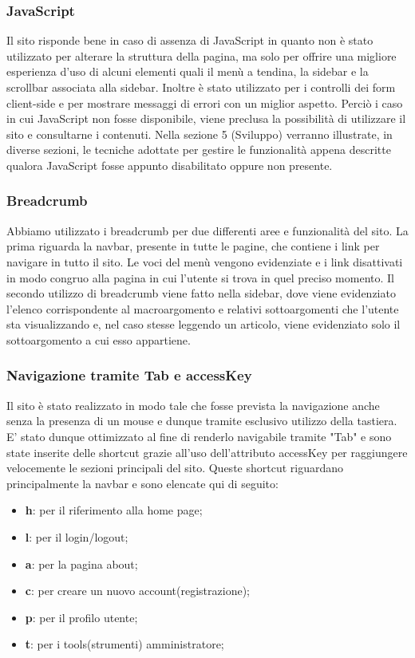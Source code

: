 \documentclass[12pt]{article}
\begin{document}
	\subsubsection{JavaScript}
	Il sito risponde bene in caso di assenza di JavaScript in quanto non è stato utilizzato per alterare la struttura della pagina, ma solo per offrire una migliore esperienza d'uso di alcuni elementi quali il menù a tendina, la sidebar e la scrollbar associata alla sidebar. Inoltre è stato utilizzato per i controlli dei form client-side e per mostrare messaggi di errori con un miglior aspetto.  Perciò i caso in cui JavaScript non fosse disponibile, viene preclusa la possibilità di utilizzare il sito e consultarne i contenuti.
	Nella sezione 5 (Sviluppo) verranno illustrate, in diverse sezioni, le tecniche adottate per gestire le funzionalità appena descritte qualora JavaScript fosse appunto disabilitato oppure non presente.
	\subsubsection{Breadcrumb}
	Abbiamo utilizzato i breadcrumb per due differenti aree e funzionalità del sito. La prima riguarda la navbar, presente in tutte le pagine, che contiene i link per navigare in tutto il sito. Le voci del menù vengono evidenziate e i link disattivati in modo congruo alla pagina in cui l'utente si trova in quel preciso momento. Il secondo utilizzo di breadcrumb viene fatto nella sidebar, dove viene evidenziato l'elenco corrispondente al macroargomento e relativi sottoargomenti che l'utente sta visualizzando e, nel caso stesse leggendo un articolo, viene evidenziato solo il sottoargomento a cui esso appartiene.
	\subsubsection{Navigazione tramite Tab e accessKey}
	Il sito è stato realizzato in modo tale che fosse prevista la navigazione anche senza la presenza di un mouse e dunque tramite esclusivo utilizzo della tastiera. E' stato dunque ottimizzato al fine di renderlo navigabile tramite "Tab" e sono state inserite delle shortcut grazie all'uso dell'attributo accessKey per raggiungere velocemente le sezioni principali del sito. Queste shortcut riguardano principalmente la navbar e sono elencate qui di seguito:
	\begin{itemize}
	\item \textbf{h}: per il riferimento alla home page;
	\item \textbf{l}: per il login/logout;
	\item \textbf{a}: per la pagina about;
	\item \textbf{c}: per creare un nuovo account(registrazione);
	\item \textbf{p}: per il profilo utente;
	\item \textbf{t}: per i tools(strumenti) amministratore;
	\end{itemize}
	
\end{document}
